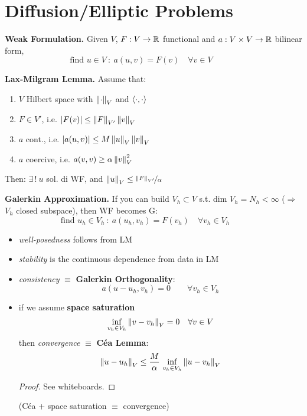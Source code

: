 

\section{Diffusion/Elliptic Problems}


\textbf{Weak Formulation.} Given $V$, $F:V\to\mathbb{R}$ functional and $a:V\times V\to\mathbb{R}$ bilinear form,
\begin{equation*}
\boxed{\text{find } u\in V\ :\ a(u,v)=F(v)\quad\forall v\in V}\qquad\quad
\end{equation*}

\smallskip

\textbf{Lax-Milgram Lemma.} Assume that:
\begin{enumerate}
\item $V$ Hilbert space with $\left\lVert \cdot \right\rVert_V$ and $\left\langle \cdot,\cdot \right\rangle$
\item $F\in V'$, i.e. $\left\lvert F(v) \right\rvert\leq \left\lVert F \right\rVert_{V'}\left\lVert v \right\rVert_V$
\item $a$ cont., i.e. $\left\lvert a(u,v) \right\rvert\leq M \left\lVert u \right\rVert_V\left\lVert v \right\rVert_V$
\item $a$ coercive, i.e. $a(v,v)\geq \alpha \left\lVert v \right\rVert_V^2$
\end{enumerate}
Then: $\exists\,!\ u$ sol. di WF, and $\left\lVert u \right\rVert_V\leq \nicefrac{\left\lVert F \right\rVert_{V'}}{\alpha}$

\medskip

\textbf{Galerkin Approximation.} If you can build $V_h\subset V$ s.t. $\text{dim }V_h=N_h<\infty$ ($\Rightarrow$ $V_h$ closed subspace), then WF becomes G:
\begin{equation*}
\boxed{\text{find } u_h\in V_h\ :\ a(u_h,v_h)=F(v_h)\quad\forall v_h\in V_h}\qquad
\end{equation*}

\begin{itemize}
\item \emph{well-posedness} follows from LM
\item \emph{stability} is the continuous dependence from data in LM
\item \emph{consistency} $\equiv$ \textbf{Galerkin Orthogonality}:
\begin{equation*}
a(u-u_h,v_h)=0\qquad\forall v_h\in V_h
\end{equation*}
\item if we assume \textbf{space saturation}
\begin{equation*}
\inf_{v_h\in V_h}\left\lVert v-v_h \right\rVert_V=0\quad\forall v\in V
\end{equation*}
then \emph{convergence} $\equiv$ \textbf{Céa Lemma}:
\begin{equation*}
\left\lVert u-u_h \right\rVert_V\leq \frac{M}{\alpha}\,\inf_{v_h\in V_h}\left\lVert u-v_h \right\rVert_V
\end{equation*}
\begin{proof}
See whiteboards.
\end{proof}
(Céa + space saturation $\equiv$ convergence)
\end{itemize}

